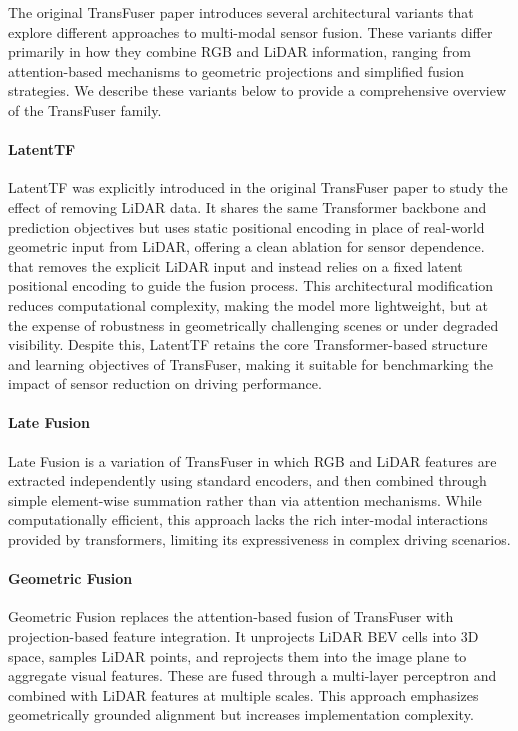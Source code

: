 The original TransFuser paper introduces several architectural variants that explore different approaches to multi-modal sensor fusion. These variants differ primarily in how they combine RGB and LiDAR information, ranging from attention-based mechanisms to geometric projections and simplified fusion strategies. We describe these variants below to provide a comprehensive overview of the TransFuser family.

\paragraph{LatentTF} LatentTF was explicitly introduced in the original TransFuser paper to study the effect of removing LiDAR data. It shares the same Transformer backbone and prediction objectives but uses static positional encoding in place of real-world geometric input from LiDAR, offering a clean ablation for sensor dependence. that removes the explicit LiDAR input and instead relies on a fixed latent positional encoding to guide the fusion process. This architectural modification reduces computational complexity, making the model more lightweight, but at the expense of robustness in geometrically challenging scenes or under degraded visibility. Despite this, LatentTF retains the core Transformer-based structure and learning objectives of TransFuser, making it suitable for benchmarking the impact of sensor reduction on driving performance.

\paragraph{Late Fusion} Late Fusion is a variation of TransFuser in which RGB and LiDAR features are extracted independently using standard encoders, and then combined through simple element-wise summation rather than via attention mechanisms. While computationally efficient, this approach lacks the rich inter-modal interactions provided by transformers, limiting its expressiveness in complex driving scenarios.

\paragraph{Geometric Fusion} Geometric Fusion replaces the attention-based fusion of TransFuser with projection-based feature integration. It unprojects LiDAR BEV cells into 3D space, samples LiDAR points, and reprojects them into the image plane to aggregate visual features. These are fused through a multi-layer perceptron and combined with LiDAR features at multiple scales. This approach emphasizes geometrically grounded alignment but increases implementation complexity.

